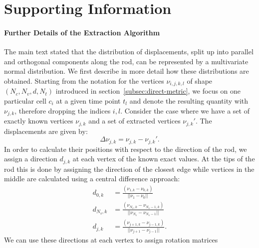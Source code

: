 \newpage

\section*{Supporting Information}

\paragraph*{Further Details of the Extraction Algorithm}
\label{sec:supplement-extraction-algorithm}
The main text stated that the distribution of displacements, split up into parallel and orthogonal
components along the rod, can be represented by a multivariate normal distribution.
We first describe in more detail how these distributions are obtained.
Starting from the notation for the vertices $\nu_{i,j,k,l}$ of shape $(N_c,N_v,d,N_t)$ introduced in
section~\ref{subsec:direct-metric}, we focus on one particular cell $c_i$ at a given time point
$t_l$ and denote the resulting quantity with $\nu_{j,k}$, therefore dropping the indices $i,l$.
Consider the case where we have a set of exactly known vertices $\nu_{j,k}$ and a set of extracted
vertices $\nu_{j,k}'$.
The displacements are given by:
\begin{equation}
    \Delta \nu_{j,k} = \nu_{j,k} - \nu_{j,k}'.
\end{equation}
In order to calculate their positions with respect to the direction of the rod, we assign a
direction $d_{j,k}$ at each vertex of the known exact values.
At the tips of the rod this is done by assigning the direction of the closest edge while vertices in
the middle are calculated using a central difference approach:
\begin{align}
    d_{0,k} &= \frac{(\nu_{1,k}-\nu_{0,k})}{||\nu_1 - \nu_0||}\\
    d_{N_v,k} &= \frac{(\nu_{N_v,k}-\nu_{N_v-1,k})}{||\nu_{N_v} - \nu_{N_v-1}||}\\
    d_{j,k} &= \frac{(\nu_{j+1,k}-\nu_{j-1,k})}{||\nu_{j+1} - \nu_{j-1}||}.
\end{align}
We can use these directions at each vertex to assign rotation matrices
